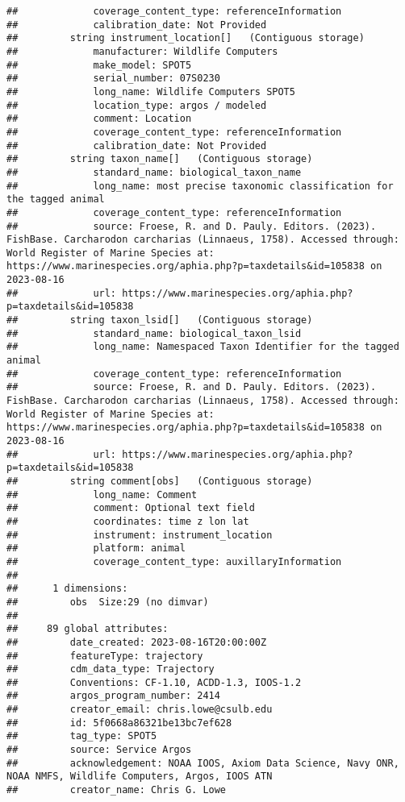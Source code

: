 \documentclass[
]{book}
\begin{document}
\begin{verbatim}
##             coverage_content_type: referenceInformation
##             calibration_date: Not Provided
##         string instrument_location[]   (Contiguous storage)  
##             manufacturer: Wildlife Computers
##             make_model: SPOT5
##             serial_number: 07S0230
##             long_name: Wildlife Computers SPOT5
##             location_type: argos / modeled
##             comment: Location
##             coverage_content_type: referenceInformation
##             calibration_date: Not Provided
##         string taxon_name[]   (Contiguous storage)  
##             standard_name: biological_taxon_name
##             long_name: most precise taxonomic classification for the tagged animal
##             coverage_content_type: referenceInformation
##             source: Froese, R. and D. Pauly. Editors. (2023). FishBase. Carcharodon carcharias (Linnaeus, 1758). Accessed through: World Register of Marine Species at: https://www.marinespecies.org/aphia.php?p=taxdetails&id=105838 on 2023-08-16
##             url: https://www.marinespecies.org/aphia.php?p=taxdetails&id=105838
##         string taxon_lsid[]   (Contiguous storage)  
##             standard_name: biological_taxon_lsid
##             long_name: Namespaced Taxon Identifier for the tagged animal
##             coverage_content_type: referenceInformation
##             source: Froese, R. and D. Pauly. Editors. (2023). FishBase. Carcharodon carcharias (Linnaeus, 1758). Accessed through: World Register of Marine Species at: https://www.marinespecies.org/aphia.php?p=taxdetails&id=105838 on 2023-08-16
##             url: https://www.marinespecies.org/aphia.php?p=taxdetails&id=105838
##         string comment[obs]   (Contiguous storage)  
##             long_name: Comment
##             comment: Optional text field
##             coordinates: time z lon lat
##             instrument: instrument_location
##             platform: animal
##             coverage_content_type: auxillaryInformation
## 
##      1 dimensions:
##         obs  Size:29 (no dimvar)
## 
##     89 global attributes:
##         date_created: 2023-08-16T20:00:00Z
##         featureType: trajectory
##         cdm_data_type: Trajectory
##         Conventions: CF-1.10, ACDD-1.3, IOOS-1.2
##         argos_program_number: 2414
##         creator_email: chris.lowe@csulb.edu
##         id: 5f0668a86321be13bc7ef628
##         tag_type: SPOT5
##         source: Service Argos
##         acknowledgement: NOAA IOOS, Axiom Data Science, Navy ONR, NOAA NMFS, Wildlife Computers, Argos, IOOS ATN
##         creator_name: Chris G. Lowe

\end{verbatim}
\end{document}

